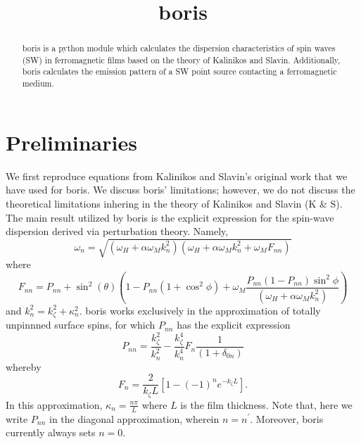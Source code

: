 \documentclass{article}
\title{boris}
\begin{document}
\maketitle
\begin{abstract}
boris is a python module which calculates the dispersion characteristics of spin waves (SW) in ferromagnetic films based on the theory of Kalinikos and Slavin. Additionally, boris calculates the emission pattern of a SW point source contacting a ferromagnetic medium. 
\end{abstract}
\section{Preliminaries}
We first reproduce equations from Kalinikos and Slavin's original work that we have used for boris. We discuss boris' limitations; however, we do not discuss the theoretical limitations inhering in the theory of Kalinikos and Slavin (K \& S). The main result utilized by boris is the explicit expression for the spin-wave dispersion derived via perturbation theory. Namely,
\begin{equation}\label{dispersion_main}
\omega_{n} = \sqrt{(\omega_{H} + \alpha \omega_{M} k_{n}^2)(\omega_{H} + \alpha \omega_{M} k_{n}^2 + \omega_{M} F_{nn})}
\end{equation}
where
\begin{equation}
F_{nn} = P_{nn} + \sin^2(\theta) \left(1 - P_{nn} \left( 1 + \cos^2{\phi}\right) + \omega_{M} \frac{P_{nn}(1-P_{nn})\sin^2{\phi}}{(\omega_{H} + \alpha \omega_{M} k_{n}^2)} \right)
\end{equation}
and $k_{n}^2 = k_{\zeta}^2 + \kappa_{n}^2$. boris works exclusively in the approximation of totally unpinnned surface spins, for which $P_{nn}$ has the explicit expression
\begin{equation}
P_{nn} = \frac{k_{\zeta}^2}{k_{n}^2} - \frac{k_{\zeta}^4}{k_{n}^4} F_{n} \frac{1}{(1 + \delta_{0n})}
\end{equation}
whereby
\begin{equation}
F_{n} = \frac{2}{k_{\zeta}L} [1 - (-1)^n e^{-k_{\zeta}L}].
\end{equation}
In this approximation, $\kappa_{n} = \frac{n \pi}{L}$ where $L$ is the film thickness. 
Note that, here we write $P_{nn}$ in the diagonal approximation, wherein $n = n^{\prime}$. 
Moreover, boris currently always sets $n = 0$.
\end{document}
